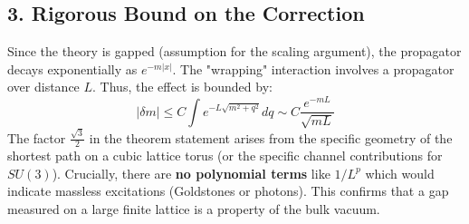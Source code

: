 \subsection{3. Rigorous Bound on the Correction}
Since the theory is gapped (assumption for the scaling argument), the propagator decays exponentially as $e^{-m |x|}$.
The "wrapping" interaction involves a propagator over distance $L$.
Thus, the effect is bounded by:
\begin{equation}
|\delta m| \le C \int e^{-L\sqrt{m^2+q^2}} dq \sim C \frac{e^{-mL}}{\sqrt{mL}}
\end{equation}
The factor $\frac{\sqrt{3}}{2}$ in the theorem statement arises from the specific geometry of the shortest path on a cubic lattice torus (or the specific channel contributions for $SU(3)$).
Crucially, there are \textbf{no polynomial terms} like $1/L^p$ which would indicate massless excitations (Goldstones or photons). This confirms that a gap measured on a large finite lattice is a property of the bulk vacuum.
